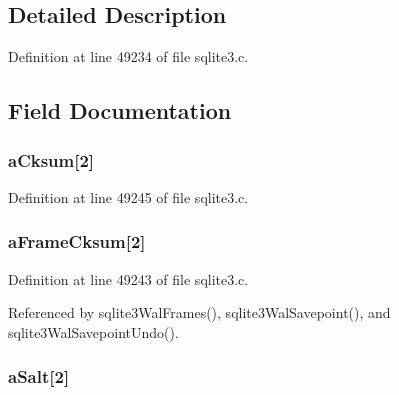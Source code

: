 \subsection{Detailed Description}


Definition at line 49234 of file sqlite3.\+c.



\subsection{Field Documentation}
\hypertarget{struct_wal_index_hdr_a2a85ae431bbf2fbacddaded256af793d}{}
\subsubsection[{a\+Cksum}]{ a\+Cksum\mbox{[}2\mbox{]}}\label{struct_wal_index_hdr_a2a85ae431bbf2fbacddaded256af793d}


Definition at line 49245 of file sqlite3.\+c.

\hypertarget{struct_wal_index_hdr_a051d00825e8208ac79cea1d0e3765729}{}
\subsubsection[{a\+Frame\+Cksum}]{ a\+Frame\+Cksum\mbox{[}2\mbox{]}}\label{struct_wal_index_hdr_a051d00825e8208ac79cea1d0e3765729}


Definition at line 49243 of file sqlite3.\+c.



Referenced by sqlite3\+Wal\+Frames(), sqlite3\+Wal\+Savepoint(), and sqlite3\+Wal\+Savepoint\+Undo().

\hypertarget{struct_wal_index_hdr_a4d22f22e15eb954f645220314c23166f}{}
\subsubsection[{a\+Salt}]{ a\+Salt\mbox{[}2\mbox{]}}\label{struct_wal_index_hdr_a4d22f22e15eb954f645220314c23166f}


